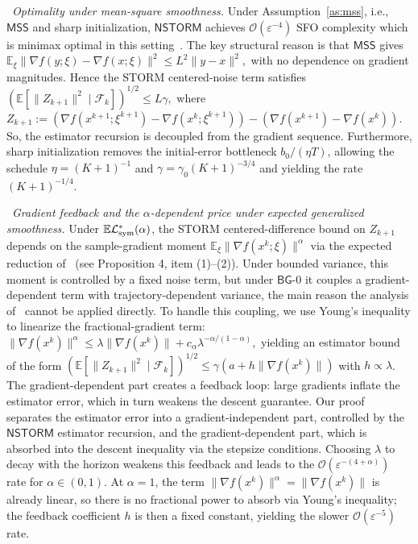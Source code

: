 \documentclass[letter,11pt]{article}
\newcommand{\E}{\mathbb{E}}
\newcommand{\cF}{\mathcal{F}}
\newcommand{\Ocal}{\mathcal{O}}
\newcommand{\Lcal}{\mathcal{L}}
\begin{document}
\noindent \textbullet\  \textit{Optimality under mean-square smoothness.}
Under Assumption~\ref{as:mss}, i.e., $\mathsf{MSS}$ and sharp initialization, $\mathsf{NSTORM}$ achieves $\Ocal(\varepsilon^{-4})$ SFO complexity which is minimax optimal in this setting~\cite{fazla2026lower}. The key structural reason is that $\mathsf{MSS}$ gives $\E_\xi\|\nabla f(y;\xi)-\nabla f(x;\xi)\|^2 \le L^2\|y-x\|^2,$ with no dependence on gradient magnitudes. Hence the STORM centered-noise term satisfies $\left(\E[\|Z_{k+1}\|^2\mid\cF_k]\right)^{1/2}\le L\gamma,$ where $Z_{k+1} := \left( \nabla f(x^{k+1};\xi^{k+1}) - \nabla f(x^k;\xi^{k+1}) \right) - \left( \nabla f(x^{k+1}) - \nabla f(x^k) \right).$ So, the estimator recursion is decoupled from the gradient sequence. Furthermore, sharp initialization removes the initial-error bottleneck $b_0/(\eta T)$, allowing the schedule $\eta=(K+1)^{-1}$ and $\gamma=\gamma_0(K+1)^{-3/4}$ and yielding the rate $(K+1)^{-1/4}$.

\noindent \textbullet\  \textit{Gradient feedback and the $\alpha$-dependent price under expected generalized smoothness.}
Under $\E\Lcal_{\rm sym}^*(\alpha)$, the STORM centered-difference bound on $Z_{k+1}$ depends on the sample-gradient moment $\E_\xi\|\nabla f(x^k;\xi)\|^\alpha$ via the expected reduction of~\citet{chen2023generalized} (see Proposition 4, item (1)--(2)). Under bounded variance, this moment is controlled by a fixed noise term, but under $\mathsf{BG}$-0 it couples a gradient-dependent term with trajectory-dependent variance, the main reason the analysis of~\citet{chen2023generalized} cannot be applied directly. To handle this coupling, we use Young's inequality to linearize the fractional-gradient term: $\|\nabla f(x^k)\|^\alpha \le \lambda\|\nabla f(x^k)\| + c_\alpha\lambda^{-\alpha/(1-\alpha)},$ yielding an estimator bound of the form $(\E[\|Z_{k+1}\|^2\mid\cF_k])^{1/2} \le \gamma(a+h\|\nabla f(x^k)\|)$ with $h \propto \lambda$. The gradient-dependent part creates a feedback loop: large gradients inflate the estimator error, which in turn weakens the descent guarantee. Our proof separates the estimator error into a gradient-independent part, controlled by the $\mathsf{NSTORM}$ estimator recursion, and the gradient-dependent part, which is absorbed into the descent inequality via the stepsize conditions. Choosing $\lambda$ to decay with the horizon weakens this feedback and leads to the $\Ocal(\varepsilon^{-(4+\alpha)})$ rate for $\alpha\in(0,1)$. At $\alpha=1$, the term $\|\nabla f(x^k)\|^\alpha = \|\nabla f(x^k)\|$ is already linear, so there is no fractional power to absorb via Young's inequality; the feedback coefficient $h$ is then a fixed constant, yielding the slower $\Ocal(\varepsilon^{-5})$ rate.
\end{document}
